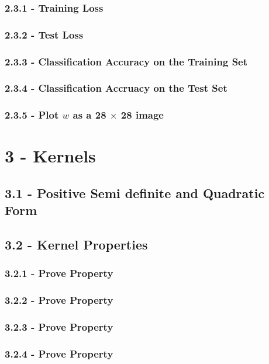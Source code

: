 \documentclass[10pt]{article}
\begin{document}
\subsubsection{2.3.1 - Training Loss}
\subsubsection{2.3.2 - Test Loss}
\subsubsection{2.3.3 - Classification Accuracy on the Training Set}
\subsubsection{2.3.4 - Classification Accruacy on the Test Set}
\subsubsection{2.3.5 - Plot \textbf{$w$} as a 28 $\times $ 28 image }


\section{3 - Kernels}
\subsection{3.1 - Positive Semi definite and Quadratic Form}
\subsection{3.2 - Kernel Properties}
\subsubsection{3.2.1 - Prove Property}
\subsubsection{3.2.2 - Prove Property}
\subsubsection{3.2.3 - Prove Property}
\subsubsection{3.2.4 - Prove Property}



\pagebreak
\end{document}
